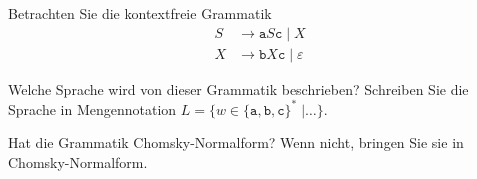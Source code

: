 Betrachten Sie die kontextfreie Grammatik
\begin{align*}
S&\to \texttt{a} S \texttt{c} \;|\; X
\\
X&\to \texttt{b}X\texttt{c} \;|\; \varepsilon
\end{align*}
\begin{teilaufgaben}
\item
Welche Sprache wird von dieser Grammatik beschrieben?
Schreiben Sie die Sprache in Mengennotation 
$L=\{
w\in\{\texttt{a},\texttt{b},\texttt{c}\}^*
\;|\dots\}$.
\item
Hat die Grammatik Chomsky-Normalform?
Wenn nicht, bringen Sie sie in Chomsky-Normalform.
\end{teilaufgaben}


